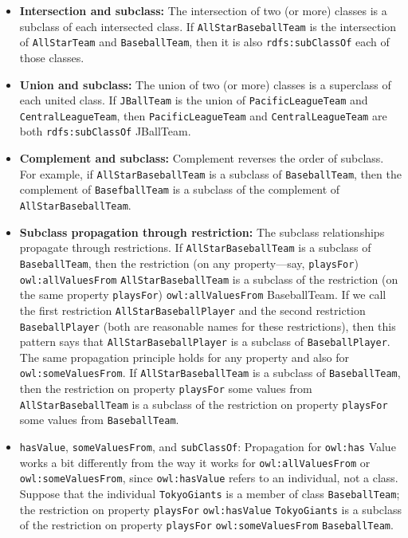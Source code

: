 \begin{itemize}
\item \textbf{Intersection and subclass:} The intersection of two (or more) classes is
a subclass of each intersected class. If \texttt{AllStarBaseballTeam} is the
intersection of \texttt{AllStarTeam} and \texttt{BaseballTeam}, then it is also
\texttt{rdfs:subClassOf} each of those classes.

\item \textbf{Union and subclass:} The union of two (or more) classes is a superclass
of each united class.
If \texttt{JBallTeam} is the union of \texttt{PacificLeagueTeam} and \texttt{CentralLeagueTeam},
then \texttt{PacificLeagueTeam} and \texttt{CentralLeagueTeam} are both \texttt{rdfs:subClassOf}
JBallTeam.

\item \textbf{Complement and subclass:} Complement reverses the order of subclass. For
example, if \texttt{AllStarBaseballTeam} is a subclass of \texttt{BaseballTeam}, then the
complement of \texttt{BasefballTeam} is a subclass of the complement of
\texttt{AllStarBaseballTeam}.

\item \textbf{Subclass propagation through restriction:} The subclass relationships
propagate through
restrictions. If \texttt{AllStarBaseballTeam} is a subclass of \texttt{BaseballTeam}, then
the restriction (on any property---say, \texttt{playsFor}) \texttt{owl:allValuesFrom}
\texttt{AllStarBaseballTeam} is a subclass of the restriction (on the same
property \texttt{playsFor}) \texttt{owl:allValuesFrom} BaseballTeam. If we call the first
restriction \texttt{AllStarBaseballPlayer} and the second restriction
\texttt{BaseballPlayer} (both are reasonable names for these restrictions), then
this pattern says that \texttt{AllStarBaseballPlayer} is a subclass of
\texttt{BaseballPlayer}. The same propagation principle holds for any property
and also for \texttt{owl:someValuesFrom}. If
\texttt{AllStarBaseballTeam} is a subclass of \texttt{BaseballTeam}, then the restriction
on property \texttt{playsFor} some values from \texttt{AllStarBaseballTeam} is a subclass
of the restriction on property \texttt{playsFor} some values from \texttt{BaseballTeam}.

\item \texttt{hasValue}, \texttt{someValuesFrom}, and \texttt{subClassOf}: Propagation for \texttt{owl:has} Value
works a bit differently from the way it works for \texttt{owl:allValuesFrom} or
\texttt{owl:someValuesFrom}, since \texttt{owl:hasValue} refers to an individual, not a
class. Suppose that the individual \texttt{TokyoGiants} is a member of class
\texttt{BaseballTeam}; the restriction on property \texttt{playsFor} \texttt{owl:hasValue}
\texttt{TokyoGiants} is a subclass of the restriction on property \texttt{playsFor}
\texttt{owl:someValuesFrom} \texttt{BaseballTeam}.


\end{itemize}
